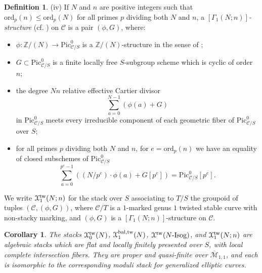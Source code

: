 \documentclass[11pt]{amsart}
\newtheorem{corollary}[subsection]{Corollary}
\theoremstyle{definition}
\newtheorem{definition}[subsection]{Definition}
\begin{document}
\begin{definition}
(iv) If $N$ and $n$ are positive integers such that $\mathrm{ord}_p(n) \leq \mathrm{ord}_p(N)$ for all primes $p$ dividing both $N$ and $n$, a \textit{$[\Gamma_1(N;n)]$-structure} (cf. \cite[2.4.3]{C}) on ${\mathcal{C}}$ is a pair $(\phi,G)$, where: 
\begin{itemize}
  \item $\phi: \mathbb{Z}/(N) \rightarrow \mathrm{Pic}^0_{{\mathcal{C}}/S}$ is a $\mathbb{Z}/(N)$-structure in the sense of \cite[\S1.5]{KM1}; 
  \item $G \subset \mathrm{Pic}^0_{{\mathcal{C}}/S}$ is a finite locally free $S$-subgroup scheme which is cyclic of order $n$; 
  \item the degree $Nn$ relative effective Cartier divisor 
  \begin{displaymath}
  \sum_{a = 0}^{N-1} (\phi(a) + G)
  \end{displaymath}
  in $\mathrm{Pic}^0_{{\mathcal{C}}/S}$ meets every irreducible component of each geometric fiber of $\mathrm{Pic}^0_{{\mathcal{C}}/S}$ over $S$; 
  \item for all primes $p$ dividing both $N$ and $n$, for $e = \mathrm{ord}_p(n)$ we have an equality of closed subschemes of $\mathrm{Pic}^0_{{\mathcal{C}}/S}$ 
  \begin{displaymath}
  \sum_{a = 0}^{p^e-1} ((N/p^e) \cdot \phi(a) + G[p^e]) = \mathrm{Pic}^0_{{\mathcal{C}}/S}[p^e].
  \end{displaymath}
\end{itemize}
We write ${\mathbf{\EuScript{X}}}^{\mathrm{tw}}_1(N;n)$ for the stack over $S$ associating to $T/S$ the groupoid of tuples $({\mathcal{C}},(\phi,G))$, where ${\mathcal{C}}/T$ is a $1$-marked genus $1$ twisted stable curve with non-stacky marking, and $(\phi,G)$ is a $[\Gamma_1(N;n)]$-structure on ${\mathcal{C}}$.
\end{definition}

\begin{corollary}
The stacks ${\mathbf{\EuScript{X}}}^{\mathrm{tw}}_0(N)$, ${\mathbf{\EuScript{X}}}^{\mathrm{bal,tw}}_1(N)$, ${\mathbf{\EuScript{X}}}^{\mathrm{tw}}(N\textrm{-}\mathrm{Isog})$, and ${\mathbf{\EuScript{X}}}^{\mathrm{tw}}_1(N;n)$ are algebraic stacks which are flat and locally finitely presented over $S$, with local complete intersection fibers. They are proper and quasi-finite over $\overline{\mathcal{M}}_{1,1}$, and each is isomorphic to the corresponding moduli stack for generalized elliptic curves.
\end{corollary}
\end{document}
